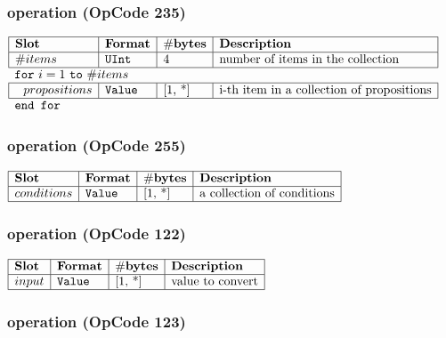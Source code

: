 \subsubsection{ operation (OpCode 235)}

\noindent
\(\begin{array}{| l | l | l | l |}
    \hline
    \bf{Slot} & \bf{Format} & \bf{\#bytes} & \bf{Description} \\
    \hline
         \#items & \lst{UInt} & \text{4} & \text{number of items in the collection} \\
    \hline
          \multicolumn{4}{l}{\lst{for}~i=1~\lst{to}~\#items} \\
    \hline
             ~~ propositions & \lst{Value} & \text{[1, *]} & \text{i-th item in a collection of propositions} \\
    \hline
          \multicolumn{4}{l}{\lst{end for}} \\
\end{array}\)
       

\subsubsection{ operation (OpCode 255)}

\noindent
\(\begin{array}{| l | l | l | l |}
    \hline
    \bf{Slot} & \bf{Format} & \bf{\#bytes} & \bf{Description} \\
    \hline
         conditions & \lst{Value} & \text{[1, *]} & \text{a collection of conditions} \\
    \hline
      
\end{array}\)
       

\subsubsection{ operation (OpCode 122)}

\noindent
\(\begin{array}{| l | l | l | l |}
    \hline
    \bf{Slot} & \bf{Format} & \bf{\#bytes} & \bf{Description} \\
    \hline
         input & \lst{Value} & \text{[1, *]} & \text{value to convert} \\
    \hline
      
\end{array}\)
       

\subsubsection{ operation (OpCode 123)}

